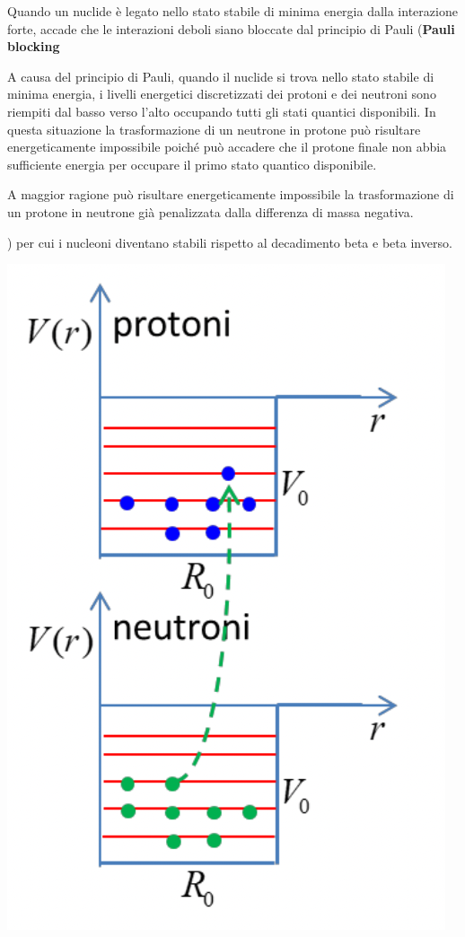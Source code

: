 Quando un nuclide è legato nello stato stabile di minima energia dalla interazione forte, accade che le interazioni
deboli siano bloccate dal principio di Pauli (\textbf{Pauli blocking}\sidenote
{
\label{siden:pauli-blocking}
A causa del principio di Pauli, quando il nuclide si trova nello stato stabile di minima energia, i livelli 
energetici discretizzati dei protoni e dei neutroni sono riempiti dal basso verso l’alto occupando tutti gli stati 
quantici disponibili.
In questa situazione la trasformazione di un neutrone in protone può risultare energeticamente impossibile poiché può 
accadere che il protone finale non abbia sufficiente energia per occupare il primo stato quantico disponibile. 

A maggior ragione può risultare energeticamente impossibile la trasformazione di un protone in neutrone già penalizzata
dalla differenza di massa negativa.}\label{sn:pauli-blocking}) per cui i nucleoni diventano stabili rispetto al
decadimento beta e beta inverso.
\begin{marginfigure}
    \centering
    \includegraphics{figs/pauli-blocking}
    \label{fig:pauli-blocking}
\end{marginfigure}

